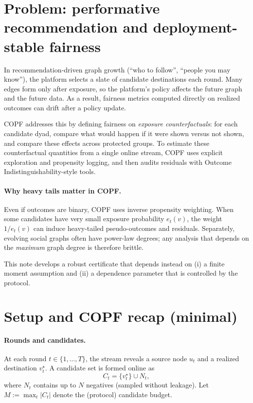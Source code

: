 \documentclass[11pt]{article}
\newcommand{\1}{\mathbf{1}}
\theoremstyle{plain}
\theoremstyle{definition}
\theoremstyle{remark}
\begin{document}
\section{Problem: performative recommendation and deployment-stable fairness}
\label{sec:intro}

In recommendation-driven graph growth (``who to follow'', ``people you may know''),
the platform selects a slate of candidate destinations each round.
Many edges form only after exposure, so the platform's policy affects the future graph and the future data.
As a result, fairness metrics computed directly on realized outcomes can drift after a policy update.

COPF addresses this by defining fairness on \emph{exposure counterfactuals}:
for each candidate dyad, compare what would happen if it were shown versus not shown,
and compare these effects across protected groups.
To estimate these counterfactual quantities from a single online stream,
COPF uses explicit exploration and propensity logging, and then audits residuals with
Outcome Indistinguishability-style tools.

\paragraph{Why heavy tails matter in COPF.}
Even if outcomes are binary, COPF uses inverse propensity weighting.
When some candidates have very small exposure probability $e_t(v)$,
the weight $1/e_t(v)$ can induce heavy-tailed pseudo-outcomes and residuals.
Separately, evolving social graphs often have power-law degrees;
any analysis that depends on the \emph{maximum} graph degree is therefore brittle.

This note develops a robust certificate that depends instead on (i) a finite moment assumption and
(ii) a dependence parameter that is controlled by the protocol.

\section{Setup and COPF recap (minimal)}
\label{sec:setup}

\paragraph{Rounds and candidates.}
At each round $t\in\{1,\dots,T\}$, the stream reveals a source node $u_t$ and a realized destination $v_t^\star$.
A candidate set is formed online as
\[C_t = \{v_t^\star\}\cup N_t,\]
where $N_t$ contains up to $N$ negatives (sampled without leakage).
Let $M:=\max_t |C_t|$ denote the (protocol) candidate budget.
\end{document}
